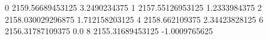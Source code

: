 0 2159.56689453125 3.2490234375
1 2157.55126953125 1.2333984375
2 2158.030029296875 1.712158203125
4 2158.662109375 2.34423828125
6 2156.31787109375 0.0
8 2155.31689453125 -1.0009765625
